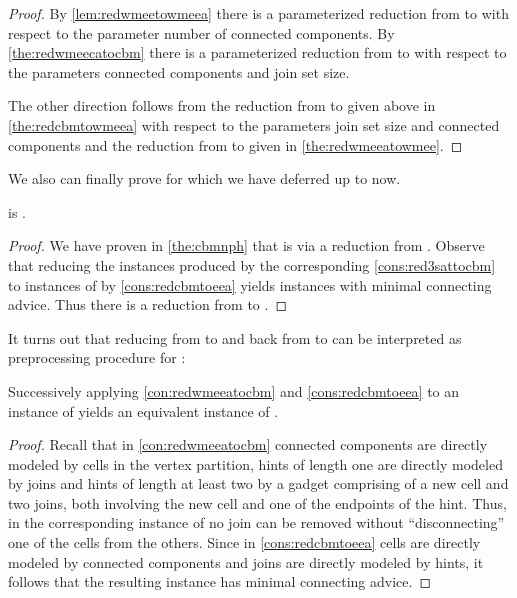 \begin{proof}
  By \autoref{lem:redwmeetowmeea} there is a parameterized reduction from \pWMEEs{} to \pWMEECAs{} with respect to the parameter number of connected components. By \autoref{the:redwmeecatocbm} there is a parameterized reduction from \pWMEECAs{} to \pCBMs{} with respect to the parameters connected components and join set size.

The other direction follows from the reduction from \pCBMs{} to \pWMEEAs{} given above in \autoref{the:redcbmtowmeea} with respect to the parameters join set size and connected components and the reduction from \pWMEEAs{} to \pWMEEs{} given in \autoref{the:redwmeeatowmee}.
\end{proof}
We also can finally prove \NPhs{} for \pWMEECAs{} which we have deferred up to now.
\begin{corollary}\label{cor:eecanph}
  \pWMEECAs{} is \NPh .
\end{corollary}
\begin{proof}
  We have proven in \autoref{the:cbmnph} that \pCBMs{} is \NPh{} via a reduction from \ptSATs{}. Observe that reducing the instances produced by the corresponding \autoref{cons:red3sattocbm} to instances of \pWMEEAs{} by \autoref{cons:redcbmtoeea} yields instances with minimal connecting advice. Thus there is a reduction from \ptSATs{} to \pWMEECAs{}.
\end{proof}
It turns out that reducing from \pWMEECAs{} to \pCBMs{} and back from \pCBMs{} to \pWMEEAs{} can be interpreted as preprocessing procedure for \pWMEECAs{}:
\begin{observation}\label{obs:redbackpreprocess}
  Successively applying \autoref{con:redwmeeatocbm} and \autoref{cons:redcbmtoeea} to an instance of \pWMEECAs{} yields an equivalent instance of \pWMEECAs{}.
\end{observation}
\begin{proof}
  Recall that in \autoref{con:redwmeeatocbm} connected components are directly modeled by cells in the vertex partition, hints of length one are directly modeled by joins and hints of length at least two by a gadget comprising of a new cell and two joins, both involving the new cell and one of the endpoints of the hint. Thus, in the corresponding instance of \pCBMs{} no join can be removed without ``disconnecting'' one of the cells from the others. Since in \autoref{cons:redcbmtoeea} cells are directly modeled by connected components and joins are directly modeled by hints, it follows that the resulting instance has minimal connecting advice.
\end{proof}
